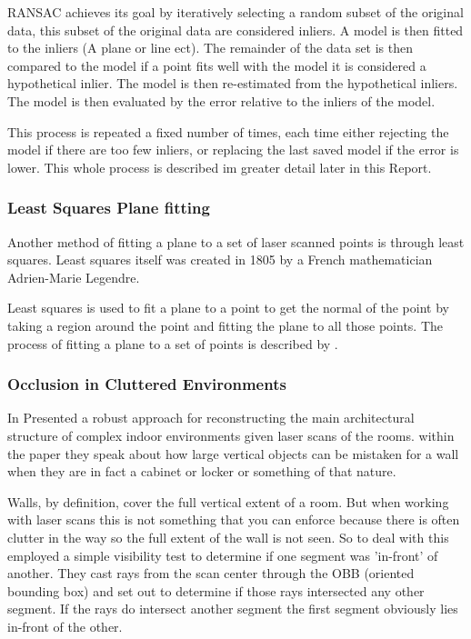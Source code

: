 			RANSAC achieves its goal by iteratively selecting a random subset of the original data, this subset of the original data are considered inliers. A model is then fitted to the inliers (A plane or line ect). The remainder of the data set is then compared to the model if a point fits well with the model it is considered a hypothetical inlier. The model is then re-estimated from the hypothetical inliers. The model is then evaluated by the error relative to the inliers of the model.
			
			This process is repeated a fixed number of times, each time either rejecting the model if there are too few inliers, or replacing the last saved model if the error is lower. This whole process is described im greater detail later in this Report.
		
		\subsubsection{Least Squares Plane fitting}
			Another method of fitting a plane to a set of laser scanned points is through least squares. Least squares itself was created in 1805 by a French mathematician Adrien-Marie Legendre.
			
			Least squares is used to fit a plane to a point to get the normal of the point by taking a region around the point and fitting the plane to all those points. The process of fitting a plane to a set of points is described by \cite{schomaker_fit_1959}.
			
	
		\subsubsection{Occlusion in Cluttered Environments}
			In \citeyear{mura_automatic_2014} \citeauthor{mura_automatic_2014} Presented a robust approach for reconstructing the main architectural structure of complex indoor environments given laser scans of the rooms. within the paper they speak about how large vertical objects can be mistaken for a wall when they are in fact a cabinet or locker or something of that nature.
			
			Walls, by definition, cover the full vertical extent of a room. But when working with laser scans this is not something that you can enforce because there is often clutter in the way so the full extent of the wall is not seen. So to deal with this \citeauthor{mura_automatic_2014} employed a simple visibility test to determine if one segment was 'in-front' of another. They cast rays from the scan center through the OBB (oriented bounding box) and set out to determine if those rays intersected any other segment. If the rays do intersect another segment the first segment obviously lies in-front of the other.
		
